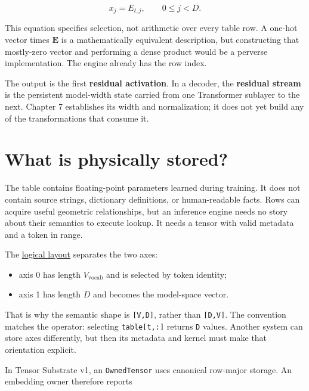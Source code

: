 \begin{equation}
x_j=E_{t,j},
\qquad 0\le j<D.
\end{equation}

This equation specifies selection, not arithmetic over every table row.
A one-hot vector times \(\mathbf{E}\) is a mathematically equivalent
description, but constructing that mostly-zero vector and performing a
dense product would be a perverse implementation. The engine already has
the row index.

The output is the first \textbf{residual activation}. In a decoder, the
\textbf{residual stream} is the persistent model-width state carried
from one Transformer sublayer to the next. Chapter 7 establishes its
width and normalization; it does not yet build any of the
transformations that consume it.

\section{What is physically stored?}\label{what-is-physically-stored}

The table contains floating-point parameters learned during training. It
does not contain source strings, dictionary definitions, or
human-readable facts. Rows can acquire useful geometric relationships,
but an inference engine needs no story about their semantics to execute
lookup. It needs a tensor with valid metadata and a token in range.

The
\href{https://github.com/hermonai/inside-the-llm-engine/blob/astra-visual-rewrite/diagrams/transformer/embedding-logical-layout.txt}{logical
layout} separates the two axes:

\begin{itemize}
\tightlist
\item
  axis 0 has length \(V_{\mathrm{vocab}}\) and is selected by token
  identity;
\item
  axis 1 has length \(D\) and becomes the model-space vector.
\end{itemize}

That is why the semantic shape is \texttt{{[}V,D{]}}, rather than
\texttt{{[}D,V{]}}. The convention matches the operator: selecting
\texttt{table{[}t,:{]}} returns \texttt{D} values. Another system can
store axes differently, but then its metadata and kernel must make that
orientation explicit.

In Tensor Substrate v1, an \texttt{OwnedTensor} uses canonical row-major
storage. An embedding owner therefore reports

